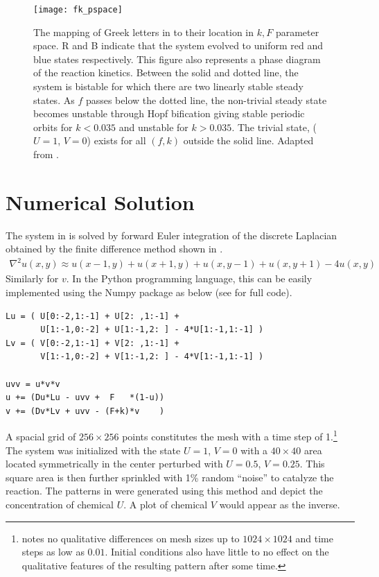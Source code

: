 \begin{figure}[h]
\begin{center}
\texttt{[image: fk\_pspace]}
\caption{\label{fig:fk_pspace} The mapping of Greek letters in  to their location in $k, F$ parameter space. R and B indicate that the system evolved to uniform red and blue states respectively. This figure also represents a phase diagram of the reaction kinetics. Between the solid and dotted line, the system is bistable for which there are two linearly stable steady states. As $f$ passes below the dotted line, the non-trivial steady state becomes unstable through Hopf bification giving stable periodic orbits for $k < 0.035$ and unstable for $k > 0.035$. The trivial state, ($U =1$, $V = 0$) exists for all $(f,k)$ outside the solid line. Adapted from \protect{}.} \label{fig:pearson_fk}
\end{center}
\end{figure}

\section{Numerical Solution} \label{ch1:gs-simulation}

The system in  is solved by forward Euler integration of the discrete Laplacian obtained by the finite difference method shown in .
	\begin{align}\label{eq:laplacian}
		\nabla^2 u(x,y) \approx u(x-1, y) + u(x+1, y) + u(x, y-1) + u(x, y+1) - 4 u(x, y)
	\end{align}
Similarly for $v$. In the Python programming language, this can be easily implemented using the Numpy package as below (see  for full code).
%
\begin{Verbatim}[fontsize=\footnotesize,frame=leftline,framesep=5mm]
Lu = ( U[0:-2,1:-1] + U[2: ,1:-1] + 
       U[1:-1,0:-2] + U[1:-1,2: ] - 4*U[1:-1,1:-1] )
Lv = ( V[0:-2,1:-1] + V[2: ,1:-1] + 
       V[1:-1,0:-2] + V[1:-1,2: ] - 4*V[1:-1,1:-1] )

uvv = u*v*v
u += (Du*Lu - uvv +  F   *(1-u))
v += (Dv*Lv + uvv - (F+k)*v    )
\end{Verbatim}

A spacial grid of $256 \times 256$ points constitutes the mesh with a time step of 1.\footnote{ notes no qualitative differences on mesh sizes up to $1024 \times 1024$ and time steps as low as $0.01$. Initial conditions also have little to no effect on the qualitative features of the resulting pattern after some time.} The system was initialized with the state $U=1$, $V=0$ with a $40 \times 40$ area located symmetrically in the center perturbed with $U=0.5$, $V=0.25$. This square area is then further sprinkled with 1\% random ``noise'' to catalyze the reaction. The patterns in  were generated using this method and depict the concentration of chemical $U$. A plot of chemical $V$ would appear as the inverse. 

